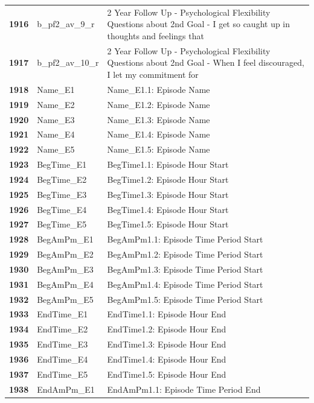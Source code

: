 \documentclass[
  letterpaper,
  DIV=11,
  numbers=noendperiod]{scrartcl}
\begin{document}
\begin{longtable}[t]{>{}cll}
\addlinespace
\textbf{1916} & b\_pf2\_av\_9\_r & 2 Year Follow Up - Psychological Flexibility Questions about 2nd Goal - I get so caught up in thoughts and feelings that\\
\textbf{1917} & b\_pf2\_av\_10\_r & 2 Year Follow Up - Psychological Flexibility Questions about 2nd Goal - When I feel discouraged, I let my commitment for\\
\textbf{1918} & Name\_E1 & Name\_E1.1: Episode Name\\
\textbf{1919} & Name\_E2 & Name\_E1.2: Episode Name\\
\textbf{1920} & Name\_E3 & Name\_E1.3: Episode Name\\
\addlinespace
\textbf{1921} & Name\_E4 & Name\_E1.4: Episode Name\\
\textbf{1922} & Name\_E5 & Name\_E1.5: Episode Name\\
\textbf{1923} & BegTime\_E1 & BegTime1.1: Episode Hour Start\\
\textbf{1924} & BegTime\_E2 & BegTime1.2: Episode Hour Start\\
\textbf{1925} & BegTime\_E3 & BegTime1.3: Episode Hour Start\\
\addlinespace
\textbf{1926} & BegTime\_E4 & BegTime1.4: Episode Hour Start\\
\textbf{1927} & BegTime\_E5 & BegTime1.5: Episode Hour Start\\
\textbf{1928} & BegAmPm\_E1 & BegAmPm1.1: Episode Time Period Start\\
\textbf{1929} & BegAmPm\_E2 & BegAmPm1.2: Episode Time Period Start\\
\textbf{1930} & BegAmPm\_E3 & BegAmPm1.3: Episode Time Period Start\\
\addlinespace
\textbf{1931} & BegAmPm\_E4 & BegAmPm1.4: Episode Time Period Start\\
\textbf{1932} & BegAmPm\_E5 & BegAmPm1.5: Episode Time Period Start\\
\textbf{1933} & EndTime\_E1 & EndTime1.1: Episode Hour End\\
\textbf{1934} & EndTime\_E2 & EndTime1.2: Episode Hour End\\
\textbf{1935} & EndTime\_E3 & EndTime1.3: Episode Hour End\\
\addlinespace
\textbf{1936} & EndTime\_E4 & EndTime1.4: Episode Hour End\\
\textbf{1937} & EndTime\_E5 & EndTime1.5: Episode Hour End\\
\textbf{1938} & EndAmPm\_E1 & EndAmPm1.1: Episode Time Period End\\

\end{longtable}
\end{document}
